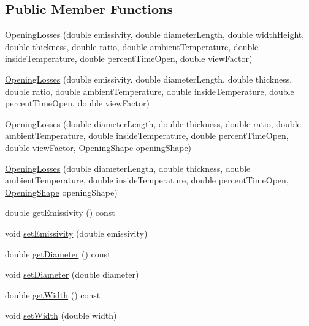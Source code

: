 \subsection*{Public Member Functions}
\begin{DoxyCompactItemize}
\item 
\hyperlink{class_opening_losses_a366fd35fabdebffee916dee77d072543}{Opening\+Losses} (double emissivity, double diameter\+Length, double width\+Height, double thickness, double ratio, double ambient\+Temperature, double inside\+Temperature, double percent\+Time\+Open, double view\+Factor)
\item 
\hyperlink{class_opening_losses_a4a9e344af1207bcc48f63a3fc2201aeb}{Opening\+Losses} (double emissivity, double diameter\+Length, double thickness, double ratio, double ambient\+Temperature, double inside\+Temperature, double percent\+Time\+Open, double view\+Factor)
\item 
\hyperlink{class_opening_losses_a274bf4f0e302d03a270e7c61c1c43055}{Opening\+Losses} (double diameter\+Length, double thickness, double ratio, double ambient\+Temperature, double inside\+Temperature, double percent\+Time\+Open, double view\+Factor, \hyperlink{class_opening_losses_a57f9759b6fd72a1b75aa885800e26157}{Opening\+Shape} opening\+Shape)
\item 
\hyperlink{class_opening_losses_a93adcb54a21a2bcb796e0e4946360a3a}{Opening\+Losses} (double diameter\+Length, double thickness, double ambient\+Temperature, double inside\+Temperature, double percent\+Time\+Open, \hyperlink{class_opening_losses_a57f9759b6fd72a1b75aa885800e26157}{Opening\+Shape} opening\+Shape)
\item 
double \hyperlink{class_opening_losses_a7eaf8e68f268e8ff1671c5f9f0462b4f}{get\+Emissivity} () const
\item 
void \hyperlink{class_opening_losses_aa63eb1c2ba9057d401f3a7f5dd974afe}{set\+Emissivity} (double emissivity)
\item 
double \hyperlink{class_opening_losses_a8ed643300b0f5b606be6cd669cd413c3}{get\+Diameter} () const
\item 
void \hyperlink{class_opening_losses_ab840ba51788e83c0b1dc9b8c05b1eadb}{set\+Diameter} (double diameter)
\item 
double \hyperlink{class_opening_losses_a0374aeac5532188358b5f6ad0f120305}{get\+Width} () const
\item 
void \hyperlink{class_opening_losses_a5ee8c514917c16ecd2c63caecc98e1c6}{set\+Width} (double width)
\item 

\end{DoxyCompactItemize}
